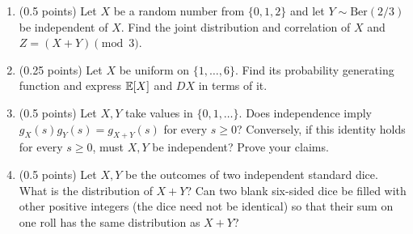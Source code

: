 \documentclass[a4paper]{report}
\begin{document}
\begin{problem}
\begin{enumerate}
\item (0.5 points) Let $X$ be a random number from $\{0,1,2\}$ and let $Y\sim\mathrm{Ber}(2/3)$ be independent of $X$. Find the joint distribution and correlation of $X$ and $Z=(X+Y)\pmod3$.
\item (0.25 points) Let $X$ be uniform on $\{1,\ldots,6\}$. Find its probability generating function and express $\mathbb {E}[X]$ and $DX$ in terms of it.
\item (0.5 points) Let $X,Y$ take values in $\{0,1,\ldots\}$. Does independence imply $g_X(s)g_Y(s)=g_{X+Y}(s)$ for every $s\geq0$? Conversely, if this identity holds for every $s\geq0$, must $X,Y$ be independent? Prove your claims.
\item (0.5 points) Let $X,Y$ be the outcomes of two independent standard dice. What is the distribution of $X+Y$? Can two blank six-sided dice be filled with other positive integers (the dice need not be identical) so that their sum on one roll has the same distribution as $X+Y$?
\end{enumerate}
\end{problem}
\end{document}
